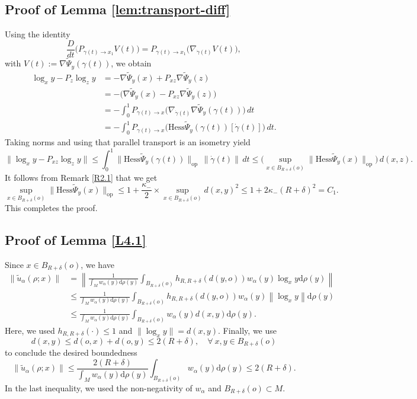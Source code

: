 \documentclass[11pt]{amsart}
\def\d{\mathrm{d}}
\newcommand{\p}{o}%
\newcommand{\dist}{d}%
\begin{document}
\subsection{Proof of Lemma \ref{lem:transport-diff}}\label{proof:lem:transport-diff}

Using the identity
\[
\frac{D}{dt}\Big(P_{\gamma(t)\to x_1}V(t)\Big)
=
P_{\gamma(t)\to x_1}\Big(\nabla_{\dot\gamma(t)}V(t)\Big),
\]
with $V(t):=\nabla \tilde{\Psi}_y(\gamma(t))$, we obtain
\begin{align*}
\log_{x}y - P_{z}\log_{z}y
&= -\nabla \tilde{\Psi}_y(x) + P_{xz}\nabla \tilde{\Psi}_y(z)\\
&= -\Big(\nabla \tilde{\Psi}_y(x)-P_{xz}\nabla \tilde{\Psi}_y(z)\Big)\\
&= -\int_0^1 P_{\gamma(t)\to x}\Big(\nabla_{\dot\gamma(t)}\nabla \tilde{\Psi}_y(\gamma(t))\Big)\,dt\\
&= -\int_0^1 P_{\gamma(t)\to x}\Big(\mathrm{Hess} \tilde{\Psi}_y(\gamma(t))[\dot\gamma(t)]\Big)\,dt.
\end{align*}
Taking norms and using that parallel transport is an isometry yield
\[
\bigl\|\log_{x}y - P_{xz}\log_{z}y\bigr\|
\le
\int_0^1 \|\mathrm{Hess} \tilde{\Psi}_y(\gamma(t))\|_{\mathrm{op}}\,\|\dot\gamma(t)\|\,dt
\le
\Big(\sup_{x\in B_{R+\delta}(o)}\|\mathrm{Hess}\tilde{\Psi}_y(x)\|_{\mathrm{op}}\Big)\,d(x,z).
\]
It follows from Remark \ref{R2.1} that we get
\[
\sup_{x\in B_{R+\delta}(o)}\|\mathrm{Hess}\tilde{\Psi}_y(x)\|_{\mathrm{op}}\leq 1+\frac{\kappa_-}{2}\times\sup_{x\in B_{R+\delta}(\p)}\dist(x, y)^2\leq1+2\kappa_-(R+\delta)^2=C_1.
\]
This completes the proof. 



\subsection{Proof of Lemma \ref{L4.1}}\label{proof:L4.1}
Since $x\in B_{R+\delta}(\p)$, we have
\begin{align*}
\|\tilde{u}_\alpha(\rho;x)\|&=\left\|\frac{1}{\int_{M}w_\alpha(y)\d \rho(y)}\int_{B_{R+\delta}(\p)}h_{R, R+\delta}(\dist(y, \p))w_\alpha(y)\log_xy\d \rho(y)\right\|\\
&\leq\frac{1}{\int_{M}w_\alpha(y)\d \rho(y)}\int_{B_{R+\delta}(\p)}h_{R, R+\delta}(\dist(y, \p))w_\alpha(y)\left\|\log_xy\right\|\d \rho(y)\\
&\leq\frac{1}{\int_{M}w_\alpha(y)\d \rho(y)}\int_{B_{R+\delta}(\p)}w_\alpha(y)\dist(x, y)\d \rho(y).
\end{align*}
Here, we used $h_{R, R+\delta}(\cdot)\leq1$ and $\|\log_xy\|=\dist(x, y)$. Finally, we use
\[
\dist(x, y)\leq \dist(\p, x)+\dist(\p, y)\leq2(R+\delta),\quad\forall~x,y\in B_{R+\delta}(\p)
\]
to conclude the desired boundedness
\[
\|\tilde{u}_\alpha(\rho;x)\|\leq\frac{2(R+\delta)}{\int_{M}w_\alpha(y)\d \rho(y)}\int_{B_{R+\delta}(\p)}w_\alpha(y)\d \rho(y)\leq2(R+\delta).
\]
In the last inequality, we used the non-negativity of $w_\alpha$ and $B_{R+\delta}(\p)\subset M$.
\end{document}
